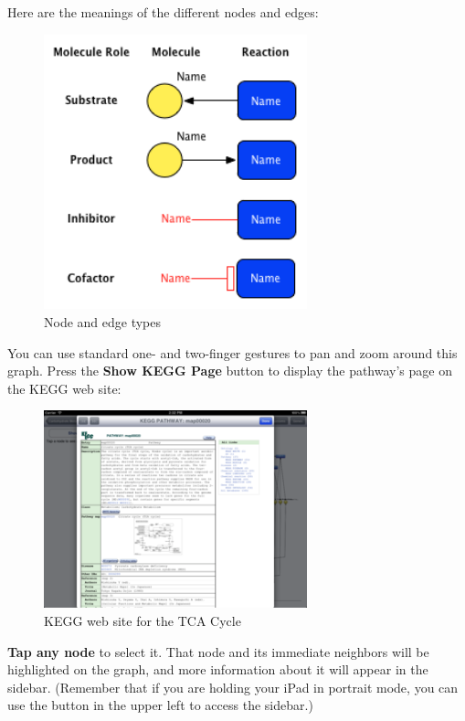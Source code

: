  \pagebreak 

Here are the meanings of the different nodes and edges:

\begin{figure}[ht!]
\centering
\includegraphics[width=3in]{kegg_manual/node_legend.png}
\caption{Node and edge types}

\end{figure}



You can use standard one- and two-finger gestures to pan and zoom around this
graph. Press the \textbf{Show KEGG Page} button to display the pathway's page on the
KEGG web site:

\begin{figure}[ht!]
\centering
\includegraphics[width=3in]{kegg_manual/kegg_web_site.png}
\caption{KEGG web site for the TCA Cycle}

\end{figure}




\textbf{Tap any node} to select it. That node and its immediate neighbors will be
highlighted on the graph, and more information about it will appear in the
sidebar. (Remember that if you are holding your iPad in portrait mode, you can
use the button in the upper left to access the sidebar.)

